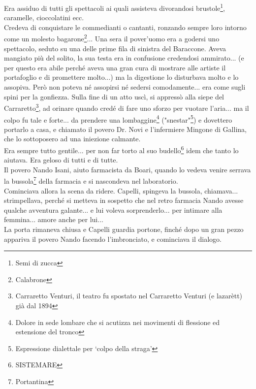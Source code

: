 \documentclass[10pt]{memoir} %
\begin{document}
Era assiduo di tutti gli spettacoli ai quali assisteva divorandosi brustole\footnote{Semi di zucca}, caramelle, cioccolatini ecc.\\
Credeva di conquistare le commedianti o cantanti, ronzando sempre loro intorno come un molesto bagarone\footnote{Calabrone}... Una sera il pover'uomo era a godersi uno spettacolo, seduto su una delle prime fila di sinistra del Baraccone. Aveva mangiato più del solito, la sua testa era in confusione credendosi ammirato... (e per questo era abile perché aveva una gran cura di mostrare alle artiste il portafoglio e di promettere molto...) ma la digestione lo disturbava molto e lo assopiva. Però non poteva né assopirsi né sedersi comodamente... era come sugli spini per la gonfiezza. Sulla fine di un atto uscì, si appressò alla siepe del Carraretto\footnote{Carraretto Venturi, il teatro fu spostato nel Carraretto Venturi (e lazarètt) già dal 1894}, ad orinare quando credé di fare uno sforzo per vuotare l'aria... ma il colpo fu tale e forte... da prendere una lombaggine\footnote{Dolore in sede lombare che si acutizza nei movimenti di flessione ed estensione del tronco} ("snestar"\footnote{Espressione dialettale per ‘colpo della straga'}) e dovettero portarlo a casa, e chiamato il povero Dr. Novi e l'infermiere Mingone di Gallina, che lo sottoposero ad una iniezione calmante. \\
Era sempre tutto gentile... per non far torto al suo budello\footnote{SISTEMARE} idem che tanto lo aiutava. Era geloso di tutti e di tutte.\\
Il povero Nando Isani, aiuto farmacista da Boari, quando lo vedeva venire serrava la bussola\footnote{Portantina} della farmacia e si nascondeva nel laboratorio.\\
Cominciava allora la scena da ridere. Capelli, spingeva la bussola, chiamava... strimpellava, perché si metteva in sospetto che nel retro farmacia Nando  avesse qualche avventura galante... e lui voleva sorprenderlo... per intimare alla femmina... amore anche per lui... \\
La porta rimaneva chiusa e Capelli guardia portone, finché dopo un gran pezzo appariva il povero Nando  facendo l'imbronciato, e cominciava il dialogo.\\
\end{document}
